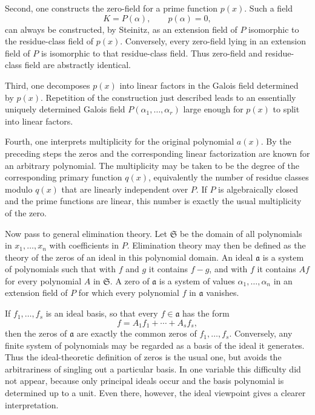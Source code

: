 \documentclass[11pt]{article}
\begin{document}
Second, one constructs the zero-field for a prime function $p(x)$. Such a field
\[
  K=P(\alpha), \qquad p(\alpha)=0,
\]
can always be constructed, by Steinitz, as an extension field of $P$ isomorphic to the residue-class field of $p(x)$. Conversely, every zero-field lying in an extension field of $P$ is isomorphic to that residue-class field. Thus zero-field and residue-class field are abstractly identical.

Third, one decomposes $p(x)$ into linear factors in the Galois field determined by $p(x)$. Repetition of the construction just described leads to an essentially uniquely determined Galois field $P(\alpha_1,\ldots,\alpha_r)$ large enough for $p(x)$ to split into linear factors.

Fourth, one interprets multiplicity for the original polynomial $a(x)$. By the preceding steps the zeros and the corresponding linear factorization are known for an arbitrary polynomial. The multiplicity may be taken to be the degree of the corresponding primary function $q(x)$, equivalently the number of residue classes modulo $q(x)$ that are linearly independent over $P$. If $P$ is algebraically closed and the prime functions are linear, this number is exactly the usual multiplicity of the zero.

Now pass to general elimination theory. Let $\mathfrak S$ be the domain of all polynomials in $x_1,\ldots,x_n$ with coefficients in $P$. Elimination theory may then be defined as the theory of the zeros of an ideal in this polynomial domain. An ideal $\mathfrak a$ is a system of polynomials such that with $f$ and $g$ it contains $f-g$, and with $f$ it contains $Af$ for every polynomial $A$ in $\mathfrak S$. A zero of $\mathfrak a$ is a system of values $\alpha_1,\ldots,\alpha_n$ in an extension field of $P$ for which every polynomial $f$ in $\mathfrak a$ vanishes.

If $f_1,\ldots,f_s$ is an ideal basis, so that every $f\in\mathfrak a$ has the form
\[
  f=A_1f_1+\cdots+A_sf_s,
\]
then the zeros of $\mathfrak a$ are exactly the common zeros of $f_1,\ldots,f_s$. Conversely, any finite system of polynomials may be regarded as a basis of the ideal it generates. Thus the ideal-theoretic definition of zeros is the usual one, but avoids the arbitrariness of singling out a particular basis. In one variable this difficulty did not appear, because only principal ideals occur and the basis polynomial is determined up to a unit. Even there, however, the ideal viewpoint gives a clearer interpretation.
\end{document}

